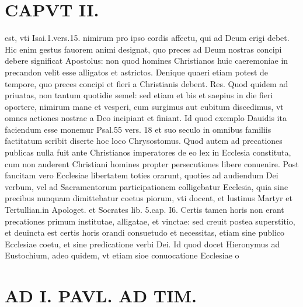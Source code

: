 \documentclass{article}
\begin{document}
\begin{pages}
\section*{CAPVT  II. }
\marginpar{[ p.75 ]}\pstart est, vti Isai.1.vers.15. nimirum pro ipso cordis affectu, qui ad Deum erigi debet. Hic enim gestus fauorem animi designat, quo preces ad Deum nostras concipi debere significat Apostolus: non quod homines Christianos huic caeremoniae in precandon velit esse alligatos et astrictos. Denique quaeri etiam potest de tempore, quo preces concipi et fieri a Christianis debent. Res. Quod quidem ad priuatas, non tantum quotidie semel: sed etiam et bis et saepius in die fieri oportere, nimirum mane et vesperi, cum surgimus aut cubitum discedimus, vt omnes actiones nostrae a Deo incipiant et finiant. Id quod exemplo Dauidis ita faciendum esse monemur Psal.55 vers. 18 et suo seculo in omnibus familiis factitatum scribit diserte hoc loco Chrysostomus. Quod autem ad precationes publicas nulla fuit ante Christianos imperatores de eo lex in Ecclesia constituta, cum non auderent Christiani homines propter persecutiones libere conuenire. Post fancitam vero Ecclesiae libertatem toties orarunt, quoties ad audiendum Dei verbum, vel ad Sacramentorum participationem colligebatur Ecclesia, quia sine precibus nunquam dimittebatur coetus piorum, vti docent, et lustinus Martyr et Tertullian.in Apologet. et Socrates lib. 5.cap. I6. Certis tamen horis non erant precationes primum institutae, alligatae, et vinctae: sed creuit postea superstitio, et deuincta est certis horis orandi consuetudo et necessitas, etiam sine publico Ecclesiae coetu, et sine predicatione verbi Dei. Id quod docet Hieronymus ad Eustochium, adeo quidem, vt etiam sioe conuocatione Ecclesiae o\pend
\section*{AD I. PAVL. AD TIM. }
\marginpar{[ p.76 ]}\pstart {}
{}

\end{pages}
\end{document}
